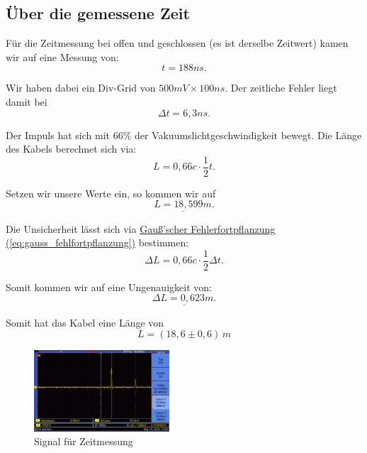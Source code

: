 \subsection*{Über die gemessene Zeit}
Für die Zeitmessung bei offen und geschlossen (es ist derselbe Zeitwert) kamen wir auf eine Messung von:
\begin{equation}
    t = 188 ns.
\end{equation}

Wir haben dabei ein Div-Grid von $500mV \times 100ns$. Der zeitliche Fehler liegt damit bei
\begin{equation}
    \Delta t = 6,3 ns.
\end{equation}

Der Impuls hat sich mit 66\% der Vakuumslichtgeschwindigkeit bewegt. Die Länge des Kabels berechnet sich via:
\begin{equation}
    L = 0,66c \cdot \frac{1}{2} t.
\end{equation}

Setzen wir unsere Werte ein, so kommen wir auf
\begin{equation}
    \underline{
        L = 18,599 m
    }.
\end{equation}

Die Unsicherheit lässt sich via \hyperref[eq:gauss_fehlfortpflanzung]{Gauß'scher Fehlerfortpflanzung (\ref*{eq:gauss_fehlfortpflanzung})} bestimmen:
\begin{equation}
    \Delta L = 0,66c \cdot \frac{1}{2} \Delta t.
\end{equation}

Somit kommen wir auf eine Ungenauigkeit von:
\begin{equation}
    \underline{
        \Delta L =  0,623m.
    }
\end{equation}

Somit hat das Kabel eine Länge von
\begin{equation}
\boxed{
    L = (18,6 \pm 0,6) \, m
}
\end{equation}

\begin{figure} [h!]
    \centering
        \includegraphics[width=0.45\textwidth]{img/25/Koaxial4/Koaxial-Kabel-Zoom.pdf}
    \caption{Signal für Zeitmessung}
    \label{fig:koax3}
\end{figure}

